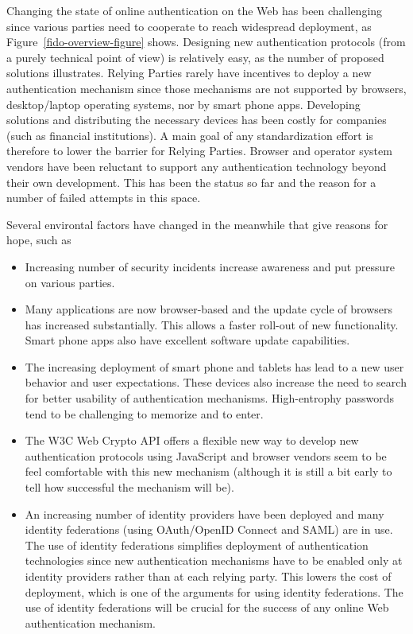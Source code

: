 \documentclass[peerreview, a4paper, 7pt]{IEEEtran}
\begin{document}
Changing the state of online authentication on the Web has been challenging since various parties need to cooperate to reach widespread deployment, as Figure~\ref{fido-overview-figure} shows. Designing new authentication protocols (from a purely technical point of view) is relatively easy, as the number of proposed solutions illustrates. Relying Parties rarely have incentives to deploy a new authentication mechanism since those mechanisms are not supported by browsers, desktop/laptop operating systems, nor by smart phone apps. Developing solutions and distributing the necessary devices has been costly for companies (such as financial institutions). A main goal of any standardization effort is therefore to lower the barrier for Relying Parties. Browser and operator system vendors have been reluctant to support any authentication technology beyond their own development. This has been the status so far and the reason for a number of failed attempts in this space. 

Several environtal factors have changed in the meanwhile that give reasons for hope, such as 
\begin{itemize}
  \item Increasing number of security incidents increase awareness and put pressure on various parties. 
  
  \item Many applications are now browser-based and the update cycle of browsers has increased substantially. This allows a faster roll-out of new functionality. Smart phone apps also have excellent software update capabilities. 
  
  \item The increasing deployment of smart phone and tablets has lead to a new user behavior and user expectations. These devices also increase the need to search for better usability of authentication mechanisms. High-entrophy passwords tend to be challenging to memorize and to enter. 
  
  \item The W3C Web Crypto API offers a flexible new way to develop new authentication protocols using JavaScript and browser vendors seem to be feel comfortable with this new mechanism (although it is still a bit early to tell how successful the mechanism will be).
  
  \item An increasing number of identity providers have been deployed and many identity federations (using OAuth/OpenID Connect and SAML) are in use. The use of identity federations simplifies deployment of authentication technologies since new authentication mechanisms have to be enabled only at identity providers rather than at each relying party. This lowers the cost of deployment, which is one of the arguments for using identity federations. The use of identity federations will be crucial for the success of any online Web authentication mechanism. 
  
\end{itemize} 
\end{document}
